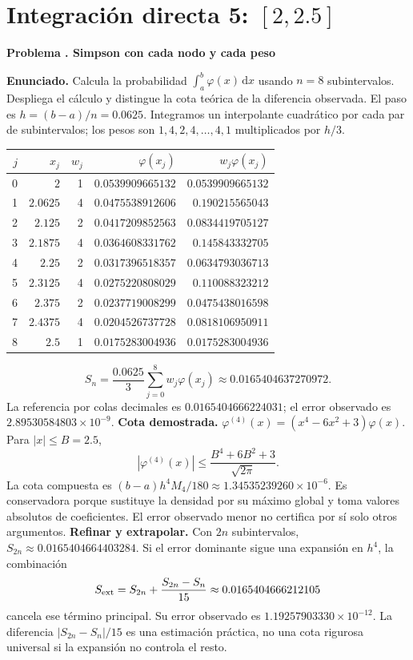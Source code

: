 \documentclass[11pt,a4paper]{article}
\newcommand{\dd}{\,\mathrm d}
\theoremstyle{definition}
\newcounter{problema}
\newenvironment{resuelto}[1]{\refstepcounter{problema}\par\medskip\Needspace{6\baselineskip}\textbf{Problema \theproblema. #1}\par}{\par\medskip}
\begin{document}
\section{\texorpdfstring{Integración directa 5: $[2,2.5]$}{Integración directa 5: [2,2.5]}}
\begin{resuelto}{Simpson con cada nodo y cada peso}
\textbf{Enunciado.} Calcula la probabilidad $\int_a^b\varphi(x)\dd x$ usando $n=8$ subintervalos. Despliega el cálculo y distingue la cota teórica de la diferencia observada.
El paso es $h=(b-a)/n=0.0625$. Integramos un interpolante cuadrático por cada par de subintervalos; los pesos son $1,4,2,4,\ldots,4,1$ multiplicados por $h/3$.

\begin{center}\small\begin{tabular}{rrrrr}
\toprule
$j$&$x_j$&$w_j$&$\varphi(x_j)$&$w_j\varphi(x_j)$\\
\midrule
0&$2$&1&$0.0539909665132$&$0.0539909665132$\\
1&$2.0625$&4&$0.0475538912606$&$0.190215565043$\\
2&$2.125$&2&$0.0417209852563$&$0.0834419705127$\\
3&$2.1875$&4&$0.0364608331762$&$0.145843332705$\\
4&$2.25$&2&$0.0317396518357$&$0.0634793036713$\\
5&$2.3125$&4&$0.0275220808029$&$0.110088323212$\\
6&$2.375$&2&$0.0237719008299$&$0.0475438016598$\\
7&$2.4375$&4&$0.0204526737728$&$0.0818106950911$\\
8&$2.5$&1&$0.0175283004936$&$0.0175283004936$\\
\bottomrule\end{tabular}\end{center}
\[
S_n=\frac{0.0625}{3}\sum_{j=0}^{8}w_j\varphi(x_j)\approx0.0165404637270972.
\]
La referencia por colas decimales es $0.0165404666224031$; el error observado es $2.89530584803\times10^{-9}$.
\textbf{Cota demostrada.} $\varphi^{(4)}(x)=(x^4-6x^2+3)\varphi(x)$. Para $|x|\le B=2.5$,
\[
|\varphi^{(4)}(x)|\le\frac{B^4+6B^2+3}{\sqrt{2\pi}}.
\]
La cota compuesta es $(b-a)h^4M_4/180\approx1.34535239260\times10^{-6}$. Es conservadora porque sustituye la densidad por su máximo global y toma valores absolutos de coeficientes. El error observado menor no certifica por sí solo otros argumentos.
\textbf{Refinar y extrapolar.} Con $2n$ subintervalos, $S_{2n}\approx0.0165404664403284$. Si el error dominante sigue una expansión en $h^4$, la combinación
\[
S_{\rm ext}=S_{2n}+\frac{S_{2n}-S_n}{15}\approx0.0165404666212105
\]
cancela ese término principal. Su error observado es $1.19257903330\times10^{-12}$. La diferencia $|S_{2n}-S_n|/15$ es una estimación práctica, no una cota rigurosa universal si la expansión no controla el resto.
\end{resuelto}
\end{document}
